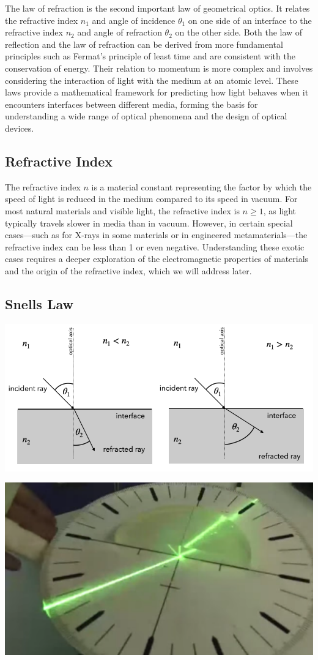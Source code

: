 \documentclass[
  a4paper,
]{book}
\begin{document}
The law of refraction is the second important law of geometrical optics.
It relates the refractive index \(n_1\) and angle of incidence
\(\theta_1\) on one side of an interface to the refractive index \(n_2\)
and angle of refraction \(\theta_2\) on the other side. Both the law of
reflection and the law of refraction can be derived from more
fundamental principles such as Fermat's principle of least time and are
consistent with the conservation of energy. Their relation to momentum
is more complex and involves considering the interaction of light with
the medium at an atomic level. These laws provide a mathematical
framework for predicting how light behaves when it encounters interfaces
between different media, forming the basis for understanding a wide
range of optical phenomena and the design of optical devices.

\subsection{Refractive Index}\label{refractive-index}

The refractive index \(n\) is a material constant representing the
factor by which the speed of light is reduced in the medium compared to
its speed in vacuum. For most natural materials and visible light, the
refractive index is \(n \ge 1\), as light typically travels slower in
media than in vacuum. However, in certain special cases---such as for
X-rays in some materials or in engineered metamaterials---the refractive
index can be less than 1 or even negative. Understanding these exotic
cases requires a deeper exploration of the electromagnetic properties of
materials and the origin of the refractive index, which we will address
later.

\subsection{Snells Law}\label{snells-law}

\includegraphics[width=0.59\linewidth,height=\textheight,keepaspectratio]{geometrical-optics/../assets/images/reflection/snell.png}
\begin{center}
\includegraphics[width=0.4\linewidth,height=\textheight,keepaspectratio]{geometrical-optics/../assets/images/reflection/refraction_law.png}
\end{center}
\end{document}
